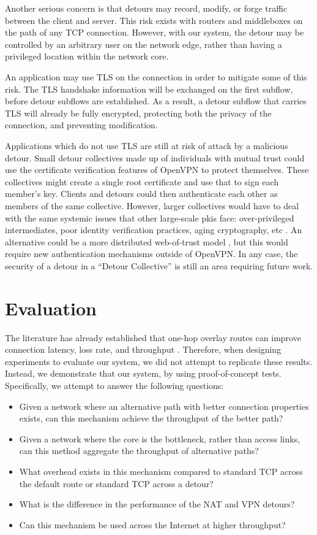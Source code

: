 \documentclass{cwru}
\begin{document}
Another serious concern is that detours may record, modify, or forge traffic
between the client and server. This risk exists with routers and middleboxes on
the path of any TCP connection. However, with our system, the detour may be
controlled by an arbitrary user on the network edge, rather than having a
privileged location within the network core.

An application may use TLS on the connection in order to mitigate some of this
risk. The TLS handshake information will be exchanged on the first subflow,
before detour subflows are established. As a result, a detour subflow that
carries TLS will already be fully encrypted, protecting both the privacy of the
connection, and preventing modification.

Applications which do not use TLS are still at risk of attack by a malicious
detour. Small detour collectives made up of individuals with mutual trust could
use the certificate verification features of OpenVPN to protect themselves.
These collectives might create a single root certificate and use that to sign
each member's key. Clients and detours could then authenticate each other as
members of the same collective. However, larger collectives would have to deal
with the same systemic issues that other large-scale \acp{pki} face:
over-privileged intermediates, poor identity verification practices, aging
cryptography, etc \cite{durumeric2013analysis}. An alternative could be a more
distributed web-of-trust model \cite{abdul1997pgp}, but this would require new
authentication mechanisms outside of OpenVPN. In any case, the security of a
detour in a ``Detour Collective'' is still an area requiring future work.

\chapter{Evaluation}
\label{c:eval}

The literature has already established that one-hop overlay routes can improve
connection latency, loss rate, and throughput
\cite{detour,ron,gummadi2004improving}. Therefore, when designing experiments to
evaluate our system, we did not attempt to replicate these results. Instead, we
demonstrate that our system, by using proof-of-concept tests. Specifically, we
attempt to answer the following questions:

\begin{itemize}
\item Given a network where an alternative path with better connection
  properties exists, can this mechanism achieve the throughput of the better
  path?
\item Given a network where the core is the bottleneck, rather than access
  links, can this method aggregate the throughput of alternative paths?
\item What overhead exists in this mechanism compared to standard TCP across the
  default route or standard TCP across a detour?
\item What is the difference in the performance of the NAT and VPN detours?
\item Can this mechanism be used across the Internet at higher throughput?
\end{itemize}
\end{document}
